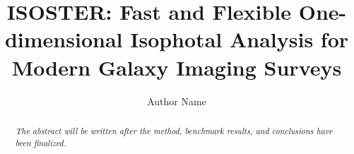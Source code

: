 \documentclass[manuscript,linenumbers,amsmath]{aastex702}
\begin{document}
\title{ISOSTER: Fast and Flexible One-dimensional Isophotal Analysis for
Modern Galaxy Imaging Surveys}

\author{Author Name}

\begin{abstract}
\textit{The abstract will be written after the method, benchmark results, and
conclusions have been finalized.}
\end{abstract}










\end{document}
